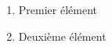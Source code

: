 \documentclass{article}
\begin{document}
\begin{enumerate}
  \item Premier élément
  \item Deuxième élément
\end{enumerate}
\end{document}
